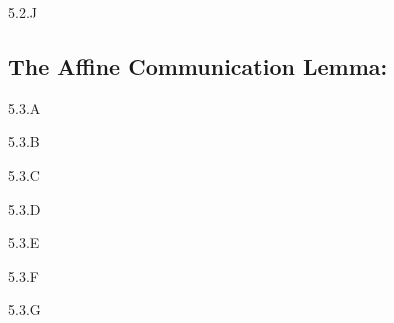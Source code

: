\begin{exercise}{5.2.J}

\end{exercise}
\begin{solution}
    \todo{}
\end{solution}


\subsection{The Affine Communication Lemma:}
\begin{exercise}{5.3.A}
\end{exercise}
\begin{solution}
    \todo{}
\end{solution}

\begin{exercise}{5.3.B}

\end{exercise}
\begin{solution}
    \todo{}
\end{solution}

\begin{exercise}{5.3.C}

\end{exercise}
\begin{solution}
    \todo{}
\end{solution}

\begin{exercise}{5.3.D}
\end{exercise}
\begin{solution}
    \todo{}
\end{solution}

\begin{exercise}{5.3.E}

\end{exercise}
\begin{solution}
    \todo{}
\end{solution}

\begin{exercise}{5.3.F}

\end{exercise}
\begin{solution}
    \todo{}
\end{solution}

\begin{exercise}{5.3.G}

\end{exercise}
\begin{solution}
    \todo{}
\end{solution}

